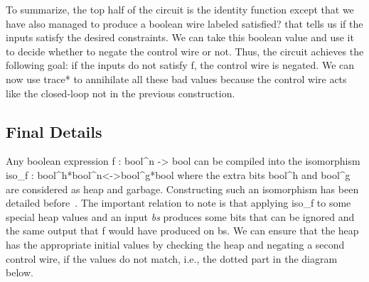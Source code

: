 \documentclass[preprint]{sigplanconf}
\begin{document}
\begin{center}
\end{center}  

To summarize, the top half of the circuit is the identity function except
that we have also managed to produce a boolean wire labeled
\textsf{satisfied?} that tells us if the inputs satisfy the desired
constraints. We can take this boolean value and use it to decide whether to
negate the control wire or not. Thus, the circuit achieves the following
goal: if the inputs do not satisfy {{f}}, the control wire is negated.  We
can now use {{trace*}} to annihilate all these bad values because the control
wire acts like the closed-loop {{not}} in the previous construction.

\subsection{Final Details}
\label{sub:f}

Any boolean expression {{f : bool^n -> bool}} can be compiled into the
isomorphism {{iso_f : bool^h*bool^n<->bool^g*bool}} where the extra bits
{{bool^h}} and {{bool^g}} are considered as heap and garbage. Constructing
such an isomorphism has been detailed
before~\cite{Toffoli:1980,infeffects}. The important relation to note is that
applying {{iso_f}} to some special heap values and an input \textit{bs}
produces some bits that can be ignored and the same output that {{f}} would
have produced on {{bs}}. We can ensure that the heap has the appropriate
initial values by checking the heap and negating a second control wire, if
the values do not match, i.e., the dotted part in the diagram below.

\begin{center}
\end{center}  
\end{document}
